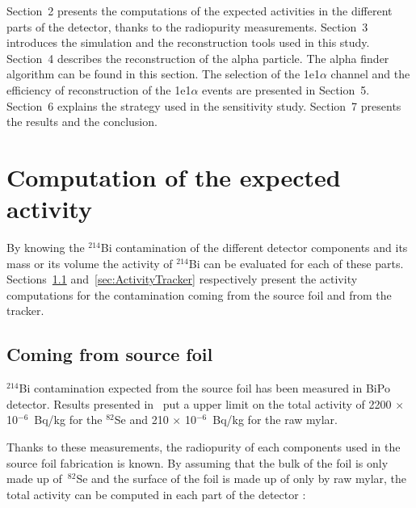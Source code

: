 \documentclass[main.tex]{subfiles}
\begin{document}
\bigskip

\noindent Section~2 presents the computations of the expected activities in the different parts of the detector, thanks to the radiopurity measurements. Section~3 introduces the simulation and the reconstruction tools used in this study. Section~4 describes the reconstruction of the alpha particle. The alpha finder algorithm can be found in this section. The selection of the 1e1$\alpha$ channel and the efficiency of reconstruction of the 1e1$\alpha$ events are presented in Section~5. Section~6 explains the strategy used in the sensitivity study. Section~7 presents the results and the conclusion. 


\clearpage
\newpage


\section{Computation of the expected activity}\label{sec:ActivityComputation}


\NI By knowing the $^{\text{214}}$Bi contamination of the different detector components and its mass or its volume the activity of $^{\text{214}}$Bi can be evaluated for each of these parts. Sections~\ref{sec:ActivitySourceFoil} and~\ref{sec:ActivityTracker} respectively present the activity computations for the contamination coming from the source foil and from the tracker.  


\subsection{Coming from source foil}\label{sec:ActivitySourceFoil}


\noindent $^{\text{214}}$Bi contamination expected from the source foil has been measured in BiPo detector. Results presented in~\cite{BiPoResultsGomez,BiPoResultsLoaiza} put a upper limit on the total activity of 2200 $\times$ 10$^{-\text{6}}$~Bq/kg for the $^{\text{82}}$Se and 210 $\times$ 10$^{-\text{6}}$~Bq/kg for the raw mylar.  


\bigskip


\noindent Thanks to these measurements, the radiopurity of each components used in the source foil fabrication is known. By assuming that the bulk of the foil is only made up of~$^{82}$Se and the surface of the foil is made up of only by raw mylar, the total activity can be computed in each part of the detector : 
\end{document}

